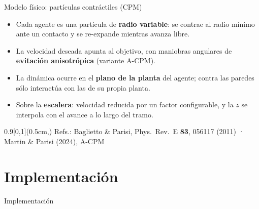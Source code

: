 \documentclass[10pt,aspectratio=169,t]{beamer}
\newcommand{\fuente}[1]{%
  \begin{textblock*}{0.9\paperwidth}[0,1](0.5cm,\dimexpr\paperheight-0.35cm\relax)
    {\tiny\color{gray} #1}%
  \end{textblock*}}
\begin{document}
\begin{frame}[c]{Modelo físico: partículas contráctiles (CPM)}
  \begin{itemize}
    \item Cada agente es una partícula de \textbf{radio variable}: se contrae al radio
      mínimo ante un contacto y se re-expande mientras avanza libre.
    \item La velocidad deseada apunta al objetivo, con maniobras angulares de
      \textbf{evitación anisotrópica} (variante A-CPM).
    \item La dinámica ocurre en el \textbf{plano de la planta} del agente; contra las
      paredes sólo interactúa con las de su propia planta.
    \item Sobre la \textbf{escalera}: velocidad reducida por un factor configurable, y la
      $z$ se interpola con el avance a lo largo del tramo.
  \end{itemize}
  \fuente{Refs.: Baglietto \& Parisi, Phys.\ Rev.\ E \textbf{83}, 056117 (2011) ·
    Martin \& Parisi (2024), A-CPM}
\end{frame}

\section{Implementación}

\begin{frame}[plain,c]
  \centering
  {\fontsize{40}{48}\selectfont Implementación\par}
\end{frame}
\end{document}
